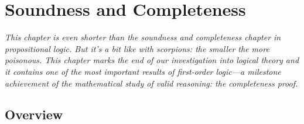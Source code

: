 \chapter{Soundness and Completeness}

\emph{This chapter is even shorter than the soundness and completeness
  chapter in propositional logic. But it's a bit like with scorpions:
  the smaller the more poisonous. This chapter marks the end of our
  investigation into logical theory and it contains one of the most
  important results of first-order logic---a milestone achievement of
  the mathematical study of valid reasoning: the completeness
  proof.}

\section{Overview}

